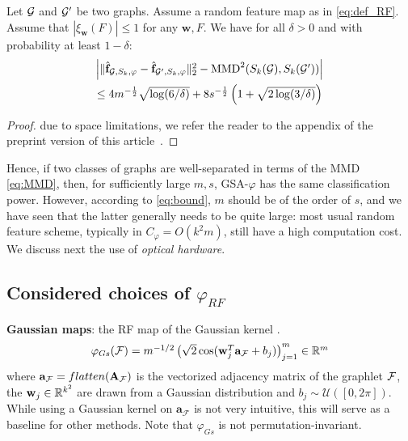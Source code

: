 \documentclass{article}
\begin{document}

\begin{theorem}\label{theorem:concentration}
Let $\mathcal{G}$ and $\mathcal{G}'$ be two graphs. %
Assume a random feature map as in \eqref{eq:def_RF}. Assume that $|\xi_\mathbf{w}(F)| \leq 1$ for any $\mathbf{w},F$.
We have for all $\delta>0$ and with probability at least $1-\delta$:
\begin{multline}\label{eq:bound}
\mathsmaller{
 \Big|\|\hat{\mathbf{f}}_{\G,S_k,\varphi} - \hat{\mathbf{f}}_{\G',S_k,\varphi} \|_2^2 - \textup{MMD}^2(S_k(\G),S_k(\G')) \Big| } \\
 \mathsmaller{ \leq 4 m^{-\frac12} \sqrt{\log (6/\delta)} + 8s^{-\frac12} \left(1+\sqrt{2\log(3/\delta)}\right)}
\end{multline}
\end{theorem}
\begin{proof}
	due to space limitations, we refer the reader to the appendix of the preprint version of this article~\cite{ghanem2020fast}.
\end{proof}
Hence, if two classes of graphs are well-separated in terms of the MMD \eqref{eq:MMD}, then, for sufficiently large $m,s$, GSA-$\varphi$ has the same classification power. However, according to \eqref{eq:bound}, $m$ should be of the order of $s$, and we have seen that the latter generally needs to be quite large:  most usual random feature scheme, typically in $C_\varphi =O(k^2 m)$, still have a high computation cost. We discuss next the use of \emph{optical hardware}.

\subsection{Considered choices of $\varphi_{RF}$}
\label{sec:phi_choices}
\textbf{Gaussian maps}: the RF map of the Gaussian kernel \cite{rahimi2008random}. 
\begin{equation}
\label{eq:Gaussian_map}
 \mathsmaller{\varphi_{Gs}(\F) = m^{-1/2} \left( \sqrt{2} \cos(\mathbf{w}_j^T\mathbf{a}_\F+b_j) \right)_{j=1}^m \in \mathbb{R}^m}
\end{equation}
where $\mathbf{a}_{\mathcal{F}}=flatten(\mathbf{A}_{\mathcal{F}})$ is the vectorized adjacency matrix of the graphlet $\mathcal{F}$, 
the $\mathbf{w}_j\in \mathbb{R}^{k^2}$ are drawn from a Gaussian distribution and $b_j \sim \mathcal{U}([0, 2\pi])$. While using a Gaussian kernel on $\mathbf{a}_\mathcal{F}$ is not very intuitive, this will serve as a baseline for other methods. Note that $\varphi_{Gs}$ is not permutation-invariant.
\end{document}
